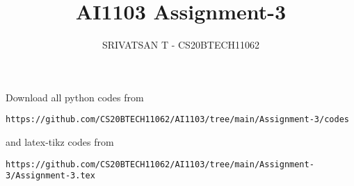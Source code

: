 \documentclass[journal,12pt,twocolumn]{IEEEtran}
\DeclareMathOperator*{\Res}{Res}
\begin{document}
\newcommand{\BEQA}{\begin{eqnarray}}
        \newcommand{\EEQA}{\end{eqnarray}}
\newcommand{\define}{\stackrel{\triangle}{=}}

\raggedbottom
\setlength{\parindent}{0pt}
\providecommand{\mbf}{\mathbf}
\providecommand{\pr}[1]{\ensuremath{\Pr\left(#1\right)}}
\providecommand{\qfunc}[1]{\ensuremath{Q\left(#1\right)}}
\providecommand{\sbrak}[1]{\ensuremath{{}\left[#1\right]}}
\providecommand{\lsbrak}[1]{\ensuremath{{}\left[#1\right.}}
\providecommand{\rsbrak}[1]{\ensuremath{{}\left.#1\right]}}
\providecommand{\brak}[1]{\ensuremath{\left(#1\right)}}
\providecommand{\lbrak}[1]{\ensuremath{\left(#1\right.}}
\providecommand{\rbrak}[1]{\ensuremath{\left.#1\right)}}
\providecommand{\cbrak}[1]{\ensuremath{\left\{#1\right\}}}
\providecommand{\lcbrak}[1]{\ensuremath{\left\{#1\right.}}
\providecommand{\rcbrak}[1]{\ensuremath{\left.#1\right\}}}
\theoremstyle{remark}
\newtheorem{rem}{Remark}
\newcommand{\sgn}{\mathop{\mathrm{sgn}}}
\providecommand{\abs}[1]{\vert#1\vert}
\providecommand{\res}[1]{\Res\displaylimits_{#1}}
\providecommand{\norm}[1]{\lVert#1\rVert}
\providecommand{\mtx}[1]{\mathbf{#1}}
\providecommand{\mean}[1]{E[#1]}
\providecommand{\fourier}{\overset{\mathcal{F}}{ \rightleftharpoons}}
\providecommand{\system}{\overset{\mathcal{H}}{ \longleftrightarrow}}
\newcommand{\solution}{\noindent \textbf{Solution: }}
\newcommand{\cosec}{\,\text{cosec}\,}
\providecommand{\dec}[2]{\ensuremath{\overset{#1}{\underset{#2}{\gtrless}}}}
\newcommand{\myvec}[1]{\ensuremath{\begin{pmatrix}#1\end{pmatrix}}}
\newcommand{\mydet}[1]{\ensuremath{\begin{vmatrix}#1\end{vmatrix}}}
\makeatletter
{}
\makeatother
\let\StandardTheFigure\thefigure
\let\vec\mathbf
\renewcommand{\thefigure}{\theproblem}
\def\putbox#1#2#3{\makebox[0in][l]{\makebox[#1][l]{}\raisebox{\baselineskip}[0in][0in]{\raisebox{#2}[0in][0in]{#3}}}}
\def\rightbox#1{\makebox[0in][r]{#1}}
\def\centbox#1{\makebox[0in]{#1}}
\def\topbox#1{\raisebox{-\baselineskip}[0in][0in]{#1}}
\def\midbox#1{\raisebox{-0.5\baselineskip}[0in][0in]{#1}}
\vspace{3cm}
\title{AI1103 Assignment-3}
\author{SRIVATSAN T - CS20BTECH11062}
\maketitle
\newpage
\bigskip
\renewcommand{\thefigure}{\theenumi}
\renewcommand{\thetable}{\theenumi}
Download all python codes from
\begin{lstlisting}
https://github.com/CS20BTECH11062/AI1103/tree/main/Assignment-3/codes
\end{lstlisting}
%
and latex-tikz codes from
%
\begin{lstlisting}
https://github.com/CS20BTECH11062/AI1103/tree/main/Assignment-3/Assignment-3.tex
\end{lstlisting}
\end{document}
